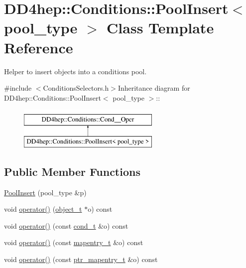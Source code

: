 \hypertarget{class_d_d4hep_1_1_conditions_1_1_pool_insert}{
\section{DD4hep::Conditions::PoolInsert$<$ pool\_\-type $>$ Class Template Reference}
\label{class_d_d4hep_1_1_conditions_1_1_pool_insert}
}


Helper to insert objects into a conditions pool.  


{\ttfamily \#include $<$ConditionsSelectors.h$>$}Inheritance diagram for DD4hep::Conditions::PoolInsert$<$ pool\_\-type $>$::\begin{figure}[H]
\begin{center}
\leavevmode
\includegraphics[height=2cm]{class_d_d4hep_1_1_conditions_1_1_pool_insert}
\end{center}
\end{figure}
\subsection*{Public Member Functions}
\begin{DoxyCompactItemize}
\item 
\hyperlink{class_d_d4hep_1_1_conditions_1_1_pool_insert_a577e9561b1733e791ad4218a289936c1}{PoolInsert} (pool\_\-type \&p)
\item 
void \hyperlink{class_d_d4hep_1_1_conditions_1_1_pool_insert_a5919829f7463342dc0eb77f32d2b4efa}{operator()} (\hyperlink{class_d_d4hep_1_1_conditions_1_1_interna_1_1_condition_object}{object\_\-t} $\ast$o) const 
\item 
void \hyperlink{class_d_d4hep_1_1_conditions_1_1_pool_insert_a414d9a2abc0fd973df8ba3153c67cfd1}{operator()} (const \hyperlink{class_d_d4hep_1_1_conditions_1_1_condition}{cond\_\-t} \&o) const 
\item 
void \hyperlink{class_d_d4hep_1_1_conditions_1_1_pool_insert_a0812562134f2be54bce7d6f87d6e4425}{operator()} (const \hyperlink{class_d_d4hep_1_1_conditions_1_1_cond_____oper_a877dac3da66795207aed15be219acbdc}{mapentry\_\-t} \&o) const 
\item 
void \hyperlink{class_d_d4hep_1_1_conditions_1_1_pool_insert_a7d713a389670422fdb90fa3b8cc710b3}{operator()} (const \hyperlink{class_d_d4hep_1_1_conditions_1_1_cond_____oper_a0949e4bd5f90cd3fae2394cf30983973}{ptr\_\-mapentry\_\-t} \&o) const 
\end{DoxyCompactItemize}
